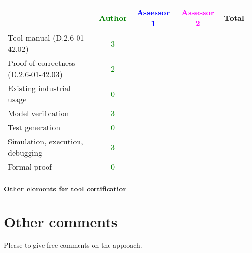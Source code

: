 

\begin{tabular}{|l | c | c | c | c|}
\hline
& \textcolor{green}{Author} & \textcolor{blue}{Assessor 1} & \textcolor{magenta}{Assessor 2} & Total \\
\hline 
Tool manual (D.2.6-01-42.02) & \textcolor{green}{3} & & &  \\
\hline
Proof of correctness (D.2.6-01-42.03)   & \textcolor{green}{2} & & & \\
\hline
Existing industrial  usage  &  \textcolor{green}{0} & & & \\
\hline
Model verification & \textcolor{green}{3} & & & \\
\hline
Test generation & \textcolor{green}{0} & & & \\
\hline
Simulation, execution, debugging & \textcolor{green}{3} & & & \\
\hline
Formal proof & \textcolor{green}{0} & & & \\
\hline
\end{tabular}

\paragraph{Other elements for tool certification}

\section{Other comments}
Please to  give free comments on the approach.



